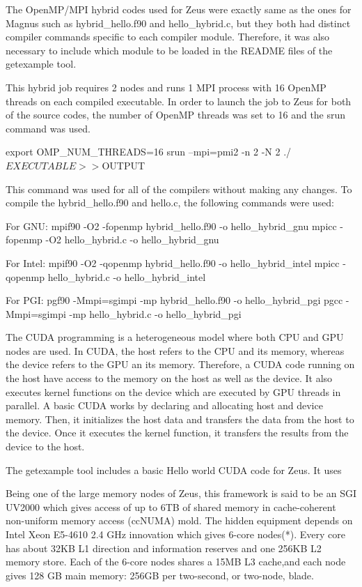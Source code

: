 \begin{Document}
The OpenMP/MPI hybrid codes used for Zeus were exactly same as the ones for Magnus such as hybrid_hello.f90 and hello_hybrid.c, but they both had
distinct compiler commands specific to each compiler module. Therefore, it was also necessary to include which module to be loaded in the README files
of the getexample tool.

This hybrid job requires 2 nodes and runs 1 MPI process with 16 OpenMP threads on each compiled executable. In order to launch the job to Zeus for both 
of the source codes, the number of OpenMP threads was set to 16 and the srun command was used.

export OMP_NUM_THREADS=16
srun --mpi=pmi2 -n 2 -N 2 ./$EXECUTABLE >> ${OUTPUT}

This command was used for all of the compilers without making any changes. To compile the hybrid_hello.f90 and hello.c, the following commands were used:

For GNU:
mpif90 -O2 -fopenmp hybrid_hello.f90 -o hello_hybrid_gnu
mpicc -fopenmp -O2 hello_hybrid.c -o hello_hybrid_gnu

For Intel:
mpif90 -O2 -qopenmp hybrid_hello.f90 -o hello_hybrid_intel
mpicc -qopenmp hello_hybrid.c -o hello_hybrid_intel

For PGI:
pgf90 -Mmpi=sgimpi -mp hybrid_hello.f90 -o hello_hybrid_pgi
pgcc -Mmpi=sgimpi -mp hello_hybrid.c -o hello_hybrid_pgi


The CUDA programming is a heterogeneous model where both CPU and GPU nodes are used. In CUDA, the host refers to the CPU and its memory, whereas the 
device refers to the GPU an its memory. Therefore, a CUDA code running on the host have access to the memory on the host as well as the device. It also 
executes kernel functions on the device which are executed by GPU threads in parallel. A basic CUDA works by declaring and allocating host and device 
memory. Then, it initializes the host data and transfers the data from the host to the device. Once it executes the kernel function, it transfers the 
results from the device to the host.

The getexample tool includes a basic Hello world CUDA code for Zeus. It uses 


Being one of the large memory nodes of Zeus, this framework is said to be an SGI UV2000 which gives access of up to 6TB of shared memory in cache-coherent non-uniform memory access (ccNUMA) mold.
The hidden equipment depends on Intel Xeon E5-4610 2.4 GHz innovation which gives 6-core nodes(*). 
Every core has about 32KB L1 direction and information reserves and one 256KB L2 memory store. 
Each of the 6-core nodes shares a 15MB L3 cache,and each node gives 128 GB main memory: 256GB per two-second, or two-node, blade.


\end{Document}
